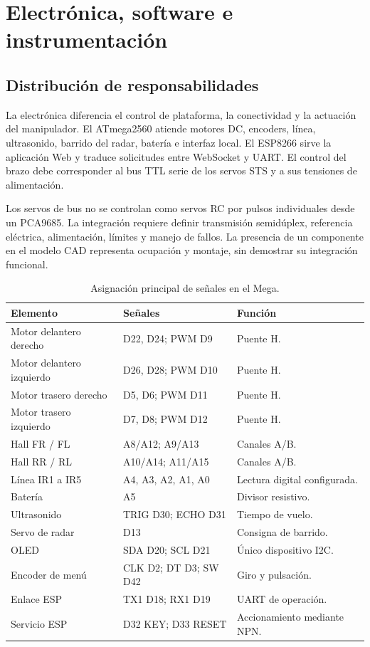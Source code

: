 \chapter{Electrónica, software e instrumentación}
\label{cap:electronica}

\section{Distribución de responsabilidades}
La electrónica diferencia el control de plataforma, la conectividad y la actuación del manipulador. El ATmega2560 atiende motores DC, encoders, línea, ultrasonido, barrido del radar, batería e interfaz local. El ESP8266 sirve la aplicación Web y traduce solicitudes entre WebSocket y UART. El control del brazo debe corresponder al bus TTL serie de los servos STS y a sus tensiones de alimentación.

Los servos de bus no se controlan como servos RC por pulsos individuales desde un PCA9685. La integración requiere definir transmisión semidúplex, referencia eléctrica, alimentación, límites y manejo de fallos. La presencia de un componente en el modelo CAD representa ocupación y montaje, sin demostrar su integración funcional.

\begin{table}[!htbp]\centering\small
\caption{Asignación principal de señales en el Mega.}
\begin{tabularx}{\linewidth}{@{}P{38mm}YP{37mm}@{}}
\toprule\textbf{Elemento} & \textbf{Señales} & \textbf{Función}\\\midrule
Motor delantero derecho & D22, D24; PWM D9 & Puente H.\\
Motor delantero izquierdo & D26, D28; PWM D10 & Puente H.\\
Motor trasero derecho & D5, D6; PWM D11 & Puente H.\\
Motor trasero izquierdo & D7, D8; PWM D12 & Puente H.\\
Hall FR / FL & A8/A12; A9/A13 & Canales A/B.\\
Hall RR / RL & A10/A14; A11/A15 & Canales A/B.\\
Línea IR1 a IR5 & A4, A3, A2, A1, A0 & Lectura digital configurada.\\
Batería & A5 & Divisor resistivo.\\
Ultrasonido & TRIG D30; ECHO D31 & Tiempo de vuelo.\\
Servo de radar & D13 & Consigna de barrido.\\
OLED & SDA D20; SCL D21 & Único dispositivo I2C.\\
Encoder de menú & CLK D2; DT D3; SW D42 & Giro y pulsación.\\
Enlace ESP & TX1 D18; RX1 D19 & UART de operación.\\
Servicio ESP & D32 KEY; D33 RESET & Accionamiento mediante NPN.\\\bottomrule
\end{tabularx}
\end{table}

